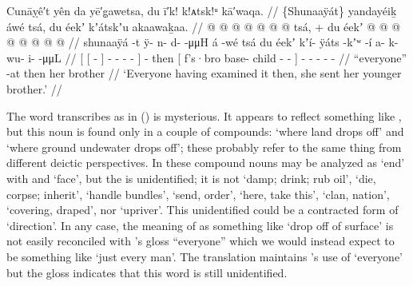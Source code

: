 
\ex\label{ex:89-96-examined-sent-ygbro}%
%
\begingl
	\glpreamble	Cunāỵê′t yên da yē′g̣awetsa, du ī′k! k!ᴀtsk!ᵘ kā′waqa. //
	\glpreamble	\{Shunaaÿát\} yandayéiḵ áwé tsá, du éekʼ kʼátskʼu akaawaḵaa. //
	\gla	{} {}  @ {} {}  @ {} @ {} @ {} @ {} @ {} {} 
		 @ {} tsá, +
		{} du éekʼ  @ {} @ {} @ {} {}
		 @ {} @ {} @ {} @ {} @ {}//
	\glb	{} {} shunaaÿá -t {} ÿ- n- d-  -μμH {} {}
		á -wé tsá
		{} du éekʼ kʼí- ÿáts -kʼʷ -í {}
		a- k- wu- i-  -μμL //
	\glc	{}[ {}[  - {}] - - - 
			- \· {}]
		 - then
		{}[  f’s·bro base- child - - {}]
		- - - -  - //
	\gld	{} {} “everyone” -at {}  {} {} {} {} {} {}
		 {} then
		{} her brother  {} {} {} {}
		 {} {} {} {} {} //
	\glft	‘Everyone having examined it then, she sent her younger brother.’
		//
\endgl
\xe

The word \citeauthor{swanton:1909} transcribes as  in (\lastx) is mysterious.
It appears to reflect something like , but this noun is found only in a couple of compounds:  ‘where land drops off’ and  ‘where ground undewater drops off’; these probably refer to the same thing from different deictic perspectives.
In these compound nouns  may be analyzed as  ‘end’ with  and  ‘face’, but the  is unidentified; it is not  ‘damp; drink; rub oil’,  ‘die, corpse; inherit’,  ‘handle bundles’,  ‘send, order’,  ‘here, take this’,  ‘clan, nation’,  ‘covering, draped’, nor  ‘upriver’.
This unidentified  could be a contracted form of  ‘direction’.
In any case, the meaning of  as something like ‘drop off of surface’ is not easily reconciled with \citeauthor{swanton:1909}’s gloss “everyone” which we would instead expect to be something like  ‘just every man’.
The translation maintains \citeauthor{swanton:1909}’s use of ‘everyone’ but the gloss indicates that this word is still unidentified.

